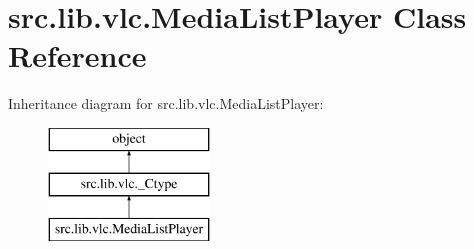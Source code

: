 \hypertarget{classsrc_1_1lib_1_1vlc_1_1MediaListPlayer}{}\section{src.\+lib.\+vlc.\+Media\+List\+Player Class Reference}
\label{classsrc_1_1lib_1_1vlc_1_1MediaListPlayer}
Inheritance diagram for src.\+lib.\+vlc.\+Media\+List\+Player\+:\begin{figure}[H]
\begin{center}
\leavevmode
\includegraphics[height=3.000000cm]{classsrc_1_1lib_1_1vlc_1_1MediaListPlayer}
\end{center}
\end{figure}
